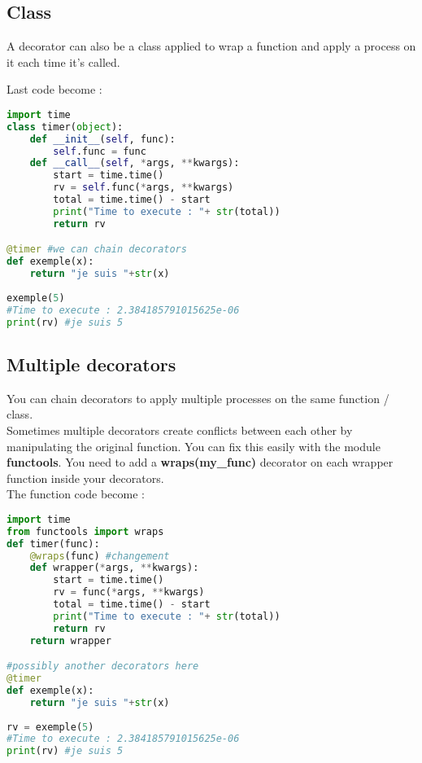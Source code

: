 \documentclass[a4paper, 12pt, titlepage]{scrartcl} %
\begin{document}
\subsection{Class}
A decorator can also be a class applied to wrap a function and apply a process on it each time it's called.

Last code become :
\begin{lstlisting}[language=Python]
import time
class timer(object):
    def __init__(self, func):
        self.func = func
    def __call__(self, *args, **kwargs):
        start = time.time()
		rv = self.func(*args, **kwargs)
		total = time.time() - start
		print("Time to execute : "+ str(total))
		return rv

@timer #we can chain decorators
def exemple(x):
	return "je suis "+str(x)
	
exemple(5)
#Time to execute : 2.384185791015625e-06
print(rv) #je suis 5
\end{lstlisting}

\subsection{Multiple decorators}
You can chain decorators to apply multiple processes on the same function / class. \\
Sometimes multiple decorators create conflicts between each other by manipulating the original function. You can fix this easily with the module \textbf{functools}. You need to add a \textbf{wraps(my\_func)} decorator on each wrapper function inside your decorators.\\

The function code become :
\begin{lstlisting}[language=Python]
import time
from functools import wraps
def timer(func):
    @wraps(func) #changement
	def wrapper(*args, **kwargs):
		start = time.time()
		rv = func(*args, **kwargs)
		total = time.time() - start
		print("Time to execute : "+ str(total))
		return rv
	return wrapper

#possibly another decorators here
@timer
def exemple(x):
	return "je suis "+str(x)
	
rv = exemple(5)
#Time to execute : 2.384185791015625e-06
print(rv) #je suis 5
\end{lstlisting}
\end{document}
